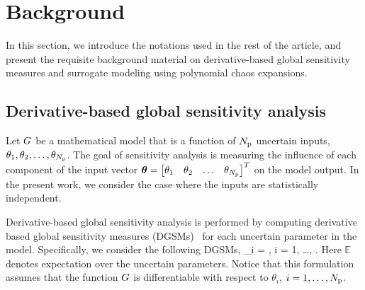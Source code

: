 \section{Background}
\label{sec:bg}

In this section, we introduce the notations used in the rest of
the article, and present the requisite background material on 
derivative-based global sensitivity measures and surrogate modeling 
using polynomial chaos expansions.

\subsection{Derivative-based global sensitivity analysis}  
\label{sub:dgsm}

Let $G$ be a mathematical model that is a function of ${N_\text{p}}$ uncertain 
inputs, $\theta_1, \theta_2, \ldots, \theta_{N_\text{p}}$. The goal of sensitivity analysis
is measuring the influence of each component of the input vector 
$\bm{\theta} = \begin{bmatrix}\theta_1 & \theta_2 & 
\ldots & \theta_{N_\text{p}}\end{bmatrix}^T$ on the model output. 
In the present work, we consider the case where the inputs are statistically 
independent. 

Derivative-based global sensitivity analysis is performed by 
computing derivative based global sensitivity measures (DGSMs)~\cite{Sobol:2009} 
for each uncertain parameter in the model. 
Specifically, we consider the following DGSMs, 
\be
\mu_i = 
, \quad i = 1, \ldots, \Np.
\label{eq:mu}
\ee
Here $\mathbb{E}$ denotes expectation over the uncertain parameters.
Notice that this formulation assumes that the function $G$ is differentiable
with respect to $\theta_i$, $i = 1, \ldots, {N_\text{p}}$.

